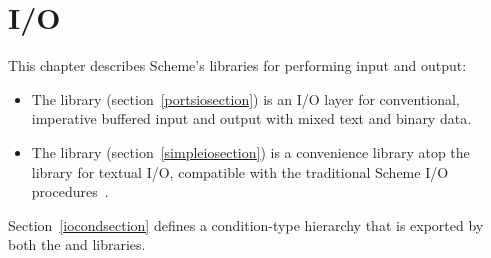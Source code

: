 \chapter{I/O}
\label{iochapter}

This chapter describes Scheme's libraries for performing input and output:

\begin{itemize}
\item The  library
  (section~\ref{portsiosection}) is an I/O layer for conventional,
  imperative buffered input and output with mixed text and binary
  data.
\item The  library
  (section~\ref{simpleiosection}) is a convenience library atop the
   library for textual I/O, compatible with 
  the traditional Scheme I/O procedures~\cite{R5RS}.
\end{itemize}

Section~\ref{iocondsection} defines a condition-type hierarchy that
is exported by both the  and
 libraries.





